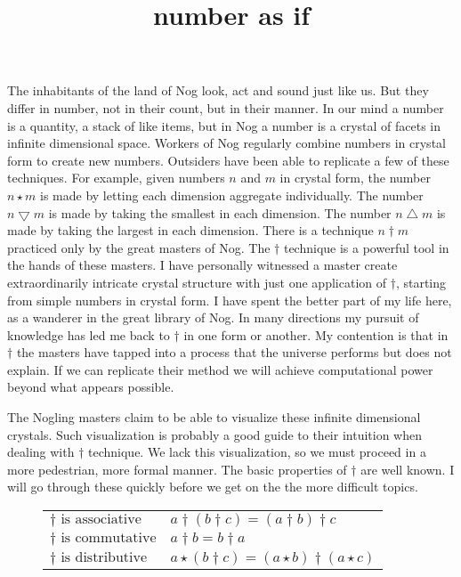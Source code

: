 \documentclass[12pt]{article}
\title{number as if}
\newcommand{\gcd}{\operatorname{gcd}}
\def\gcd{\bigtriangledown}
\def\lcm{\bigtriangleup}
\begin{document}
\maketitle

The inhabitants of the land of Nog look, act and sound just like us.  But they differ in number,
not in their count, but in their manner. In our mind a number is a quantity, a stack of like items, but in Nog
a number is a crystal of facets in infinite dimensional space. Workers of Nog regularly combine numbers in crystal form
to create new numbers.  Outsiders have been able to replicate a few of these techniques.   For example, given numbers $n$ and $m$ in crystal form, the
number $n\star m$ is made by letting each dimension aggregate individually. The number $n\gcd m$ is made by taking the
smallest in each dimension.  The number $n\lcm m$ is made by taking the
largest in each dimension.  There is a technique $n\dagger m$ practiced only by the great masters of Nog.  The $\dagger$ technique is a powerful
tool in the hands of these masters.  I have personally witnessed a master create extraordinarily intricate crystal structure with just one application of $\dagger$, starting from simple
numbers in crystal form.  I have spent the better part of my life here, as a wanderer in the great library of Nog.  In many directions my pursuit of knowledge has led me back to $\dagger$
in one form or another.  My contention is that in $\dagger$ the masters have tapped into a process that the universe performs but does not explain. If we can replicate their method
we will achieve computational power beyond what appears possible.

The Nogling masters claim to be able to visualize these infinite dimensional crystals.  Such visualization is probably a good guide to their intuition when dealing with $\dagger$ technique.
We lack this visualization, so we must proceed in a more pedestrian, more formal manner.
The basic properties of $\dagger$ are well known.  I will go through these quickly before we get on the the more difficult topics.  

\begin{figure}
\centering
\begin{tabular}{l|l}
$\dagger \text{ is associative}$ & $a\dagger(b\dagger c) = (a\dagger b) \dagger c$\\
$\dagger \text{ is commutative}$ & $a \dagger b = b\dagger a$\\
$\dagger \text{ is distributive}$ & $a\star (b \dagger c) = (a\star b)\dagger(a\star c)$\\
\end{tabular}
\end{figure}
\end{document}
